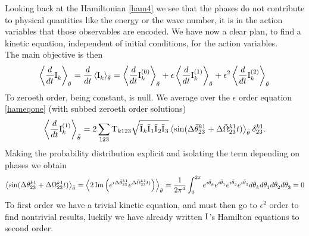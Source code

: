 Looking back at the Hamiltonian \eqref{ham4} we see that the phases do not contribute to physical quantities like the energy or the wave number, 
it is in the action variables that those observables are encoded. We have now a clear plan, to find a kinetic equation, independent of initial conditions, for
the action variables. \\
The main objective is then
\begin{equation}
    \left\langle \frac{d}{dt} \mathrm{I}^{}_k \right\rangle_{\bar{\theta}^{}} = \frac{d}{dt} \left\langle \mathrm{I}^{}_k \right\rangle_{\bar{\theta}^{}} = \left\langle \frac{d}{dt} \mathrm{I}^{(0)}_k \right\rangle_{\bar{\theta}^{}}+
    \epsilon\left\langle \frac{d}{dt} \mathrm{I}^{(1)}_k \right\rangle_{\bar{\theta}^{}} + \epsilon^2\left\langle \frac{d}{dt} \mathrm{I}^{(2)}_k \right\rangle_{\bar{\theta}^{}} 
    \label{kineticexp}
\end{equation}
To zeroeth order, being constant, is null. We average over the $\epsilon$ order equation \eqref{hameqone} (with subbed zeroeth order solutions)
\begin{equation}
    \left\langle \frac{d}{dt} \mathrm{I}^{(1)}_k \right\rangle_{\bar{\theta}^{}} = 2\sum_{123} \mathrm{T}_{k123} \sqrt{\bar{\mathrm{I}^{}}_k\bar{\mathrm{I}^{}}_1\bar{\mathrm{I}^{}}_2\bar{\mathrm{I}^{}}_3} \left\langle\sin(\Delta\bar{\theta}^{k1}_{23} +
    \Delta\bar{\Omega}^{k1}_{23}t)\right\rangle_{\bar{\theta}^{}}\delta^{k1}_{23}.
\end{equation}
Making the probability distribution explicit and isolating the term depending on phases we obtain
\begin{multline}
    \left\langle\sin(\Delta\bar{\theta}^{k1}_{23} + \Delta\bar{\Omega}^{k1}_{23}t)\right\rangle_{\bar{\theta}^{}} = 
    \left\langle 2 \operatorname{Im}\left(e^{i\Delta\bar{\theta}^{k1}_{23}}e^{\Delta\bar{\Omega}^{k1}_{23}t)} \right)   \right\rangle_{\bar{\theta}^{}} = 
    \frac{1}{2\pi^4}\int_{0}^{2\pi}  e^{i\bar{\theta}^{}_k}e^{i\bar{\theta}^{}_1}e^{i\bar{\theta}^{}_2}e^{i\bar{\theta}^{}_3} d \bar{\theta}^{}_k d \bar{\theta}^{}_1 d \bar{\theta}^{}_2 d \bar{\theta}^{}_3 = 0
\end{multline}
To first order we have a trivial kinetic equation, and must then go to $\epsilon^2$ order to find nontrivial results, luckily we have already written $\mathrm{I}^{}$'s 
Hamilton equations to second order. \\

